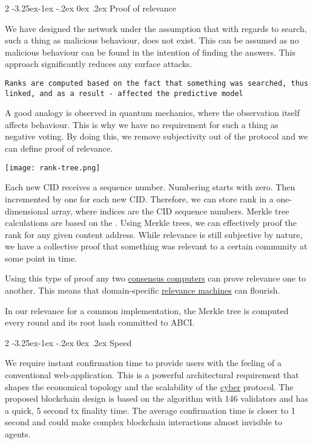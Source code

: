 \documentclass[8pt,oneside]{amsart}
\makeatletter
\newcommand{\linkred}[2]{\href{#1}{\color{red}{#2}}}
\newcommand{\linkgreen}[2]{\href{#1}{\color{green}{#2}}}
\renewcommand\subsection{\@startsection{subsection}
                                    {2}{\z@}
                                    {-3.25ex\@plus -1ex \@minus -.2ex}
                                    {0ex \@plus .2ex}
                                    {\play\Large}
                        }
\newcommand{\titleSection}[1]{\subsection{#1}}
\newenvironment{Figure}
  {\par\medskip\noindent\minipage{\linewidth}}
  {\endminipage\par\medskip}
\makeatother
\begin{document}
\titleSection{Proof of relevance}\label{proof-of-relevance}

We have designed the network under the assumption that with regards to search, such a thing as malicious behaviour, does not exist. This can be assumed as no malicious behaviour can be found in the intention of finding the answers. This approach significantly reduces any surface attacks.

\begin{lstlisting}
Ranks are computed based on the fact that something was searched, thus linked, and as a result - affected the predictive model
\end{lstlisting}

A good analogy is observed in quantum mechanics, where the observation itself affects behaviour. This is why we have no requirement for such a thing as negative voting. By doing this, we remove subjectivity out of the protocol and we can define proof of relevance.

\begin{Figure}
    \centering
    \texttt{[image: rank-tree.png]}
\end{Figure}

Each new CID receives a sequence number. Numbering starts with zero. Then incremented by one for each new CID. Therefore, we can store rank in a one-dimensional array, where indices are the CID sequence numbers. Merkle tree calculations are based on the \linkgreen{https://ipfs.io/ipfs/QmZpJLmc3T2L1FLUxzvU3P8MBCPe15fEmUyVS7Bz8ZKMhG}{RFC-6962 standard}. Using Merkle trees, we can effectively proof the rank for any given content address. While relevance is still subjective by nature, we have a collective proof that something was relevant to a certain community at some point in time.

Using this type of proof any two \linkgreen{https://ipfs.io/ipfs/QmYX1FyKg2PHr9MDKDedGwTmLEVN94ZSkMRJDCvHtZXLbg}{IBC compatible} {\hyperref[consensus-computer]{consensus computers}} can prove relevance one to another. This means that domain-specific {\hyperref[relevance-machine]{relevance machines}} can flourish.

In our relevance for a common \linkred{https://github.ccom/cybercongress/go-cyber}{go-cyber} implementation, the Merkle tree is computed every round and its root hash committed to ABCI.

\titleSection{Speed}\label{speed}

We require instant confirmation time to provide users with the feeling of a conventional web-application. This is a powerful architectural requirement that shapes the economical topology and the scalability of the {\hyperref[cyber]{cyber}} protocol. The proposed blockchain design is based on the \linkgreen{https://ipfs.io/ipfs/QmaMtD7xDgghqgjN62zWZ5TBGFiEjGQtuZBjJ9sMh816KJ}{Tendermint consensus} algorithm with 146 validators and has a quick, 5 second tx finality time. The average confirmation time is closer to 1 second and could make complex blockchain interactions almost invisible to agents.
\end{document}
